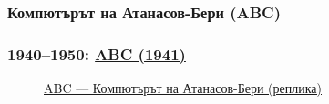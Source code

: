 \documentclass[ignorenonframetext, hyperref=unicode]{beamer}
\begin{document}
\subsubsection{Компютърът на Атанасов-Бери (ABC)}

\begin{frame}
\frametitle{1940--1950:
\href{http://en.wikipedia.org/wiki/Atanasoff-Berry_Computer}{ABC (1941)}} 
\begin{figure}[h]
\center
{}
\caption{\href{http://en.wikipedia.org/wiki/Atanasoff-Berry_Computer}{ABC
--- Компютърът на Атанасов-Бери (реплика)}}
\end{figure}
\end{frame}
\end{document}
